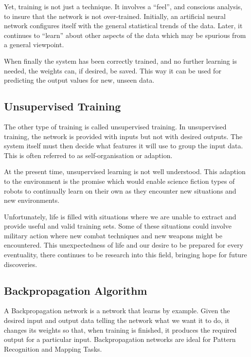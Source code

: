 Yet, training is not just a technique. It involves a ``feel'', and conscious analysis, to insure that the network is not over-trained. Initially, an artificial neural network configures itself with the general statistical trends of the data. Later, it continues to ``learn'' about other aspects of the data which may be spurious from a general viewpoint.

When finally the system has been correctly trained, and no further learning is needed, the weights can, if desired, be saved. This way it can be used for predicting the output values for new, unseen data.

\vspace{10pt}

\subsection*{Unsupervised Training}

The other type of training is called unsupervised training. In unsupervised training, the network is provided with inputs but not with desired outputs. The system itself must then decide what features it will use to group the input data. This is often referred to as self-organisation or adaption.

At the present time, unsupervised learning is not well understood. This adaption to the environment is the promise which would enable science fiction types of robots to continually learn on their own as they encounter new situations and new environments.

Unfortunately, life is filled with situations where we are unable to extract and provide useful and valid training sets. Some of these situations could involve military action where new combat techniques and new weapons might be encountered. This unexpectedness of life and our desire to be prepared for every eventuality, there continues to be research into this field, bringing hope for future discoveries.

\vspace{10pt}

\subsection{Backpropagation Algorithm}

A Backpropagation network is a network that learns by example. Given the desired input and output data telling the network what we want it to do, it changes its weights so that, when training is finished, it produces the required output for a particular input. Backpropagation networks are ideal for Pattern Recognition and Mapping Tasks.

